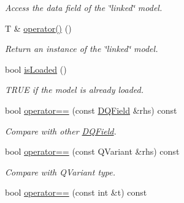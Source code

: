 \begin{DoxyCompactItemize}
\begin{DoxyCompactList}\small\item\em Access the data field of the \char`\"{}linked\char`\"{} model. \item\end{DoxyCompactList}\item 
\hypertarget{classDQForeignKey_ae5f15b513afbe527f64e44b8c9697977}{
T \& \hyperlink{classDQForeignKey_ae5f15b513afbe527f64e44b8c9697977}{operator()} ()}
\label{classDQForeignKey_ae5f15b513afbe527f64e44b8c9697977}

\begin{DoxyCompactList}\small\item\em Return an instance of the \char`\"{}linked\char`\"{} model. \item\end{DoxyCompactList}\item 
\hypertarget{classDQForeignKey_a1147f26cf490bc5a806337babd45f1c6}{
bool \hyperlink{classDQForeignKey_a1147f26cf490bc5a806337babd45f1c6}{isLoaded} ()}
\label{classDQForeignKey_a1147f26cf490bc5a806337babd45f1c6}

\begin{DoxyCompactList}\small\item\em TRUE if the model is already loaded. \item\end{DoxyCompactList}\item 
\hypertarget{classDQField_af97b044232c392fb2798a9c04d4b2c40}{
bool \hyperlink{classDQField_af97b044232c392fb2798a9c04d4b2c40}{operator==} (const \hyperlink{classDQField}{DQField} \&rhs) const}
\label{classDQField_af97b044232c392fb2798a9c04d4b2c40}

\begin{DoxyCompactList}\small\item\em Compare with other \hyperlink{classDQField}{DQField}. \item\end{DoxyCompactList}\item 
\hypertarget{classDQField_acec82d17afefbf25d64f4d46bf404429}{
bool \hyperlink{classDQField_acec82d17afefbf25d64f4d46bf404429}{operator==} (const QVariant \&rhs) const}
\label{classDQField_acec82d17afefbf25d64f4d46bf404429}

\begin{DoxyCompactList}\small\item\em Compare with QVariant type. \item\end{DoxyCompactList}\item 
\hypertarget{classDQField_a239949c5298e739f37717652a326317b}{
bool \hyperlink{classDQField_a239949c5298e739f37717652a326317b}{operator==} (const int \&t) const}
\label{classDQField_a239949c5298e739f37717652a326317b}


\end{DoxyCompactItemize}
